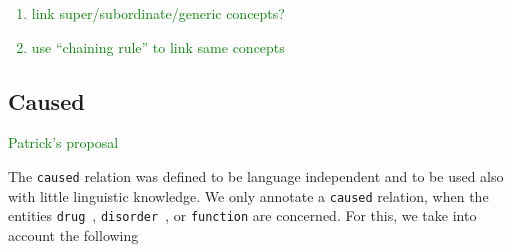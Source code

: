 \documentclass[12pt]{article}
\theoremstyle{definition}
\newcommand{\dis}{\texttt{disorder}\ }
\newcommand{\dr}{\texttt{drug}\ }
\begin{document}
\textcolor{green}{
\begin{enumerate}
    \item link super/subordinate/generic concepts? 
    \item use ``chaining rule'' to link same concepts
\end{enumerate}
}


\subsection{Caused}\label{rel_caused}

\textcolor{green}{Patrick's proposal}

The \texttt{caused} relation was defined to be language independent and to be used also with little linguistic knowledge.
We only annotate a \texttt{caused} relation, when the entities \dr, \dis, or \texttt{function} are concerned. 
For this, we take into account the following
\end{document}
